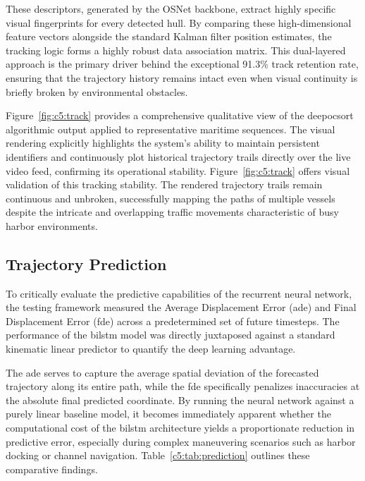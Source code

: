 These descriptors, generated by the OSNet backbone, extract highly specific visual fingerprints for every detected hull. By comparing these high-dimensional feature vectors alongside the standard Kalman filter position estimates, the tracking logic forms a highly robust data association matrix. This dual-layered approach is the primary driver behind the exceptional 91.3\% track retention rate, ensuring that the trajectory history remains intact even when visual continuity is briefly broken by environmental obstacles.
\begin{reportfigblock}
Figure~\ref{fig:c5:track} provides a comprehensive qualitative view of the \gls{deepocsort} algorithmic output applied to representative maritime sequences. The visual rendering explicitly highlights the system's ability to maintain persistent identifiers and continuously plot historical trajectory trails directly over the live video feed, confirming its operational stability.
Figure~\ref{fig:c5:track} offers visual validation of this tracking stability. The rendered trajectory trails remain continuous and unbroken, successfully mapping the paths of multiple vessels despite the intricate and overlapping traffic movements characteristic of busy harbor environments.
\end{reportfigblock}

\subsection{Trajectory Prediction}

To critically evaluate the predictive capabilities of the recurrent neural network, the testing framework measured the Average Displacement Error (\gls{ade}) and Final Displacement Error (\gls{fde}) across a predetermined set of future timesteps. The performance of the \gls{bilstm} model was directly juxtaposed against a standard kinematic linear predictor to quantify the deep learning advantage. 

The \gls{ade} serves to capture the average spatial deviation of the forecasted trajectory along its entire path, while the \gls{fde} specifically penalizes inaccuracies at the absolute final predicted coordinate. By running the neural network against a purely linear baseline model, it becomes immediately apparent whether the computational cost of the \gls{bilstm} architecture yields a proportionate reduction in predictive error, especially during complex maneuvering scenarios such as harbor docking or channel navigation. Table~\ref{c5:tab:prediction} outlines these comparative findings.

